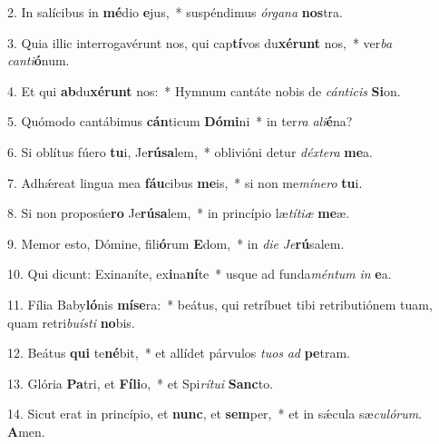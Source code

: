 2. In salícibus in \textbf{mé}dio \textbf{e}jus,~*  suspéndimus \textit{ór}\textit{ga}\textit{na} \textbf{nos}tra.\

3. Quia illic interrogavérunt nos, qui cap\textbf{tí}vos du\textbf{xé}\textbf{runt} nos,~*  ver\textit{ba} \textit{can}\textit{ti}\textbf{ó}num.\

4. Et qui \textbf{ab}du\textbf{xé}\textbf{runt} nos:~*  Hymnum cantáte nobis de \textit{cán}\textit{ti}\textit{cis} \textbf{Si}on.\

5. Quómodo cantábimus \textbf{cán}ticum \textbf{Dó}\textbf{mi}ni~*  in ter\textit{ra} \textit{a}\textit{li}\textbf{é}na?\

6. Si oblítus fúero \textbf{tu}i, Je\textbf{rú}\textbf{sa}lem,~*  oblivióni detur \textit{déx}\textit{te}\textit{ra} \textbf{me}a.\

7. Adhǽreat lingua mea \textbf{fáu}cibus \textbf{me}is,~*  si non me\textit{mí}\textit{ne}\textit{ro} \textbf{tu}i.\

8. Si non proposúe\textbf{ro} Je\textbf{rú}\textbf{sa}lem,~*  in princípio læ\textit{tí}\textit{ti}\textit{æ} \textbf{me}æ.\

9. Memor esto, Dómine, fili\textbf{ó}rum \textbf{E}dom,~*  in \textit{di}\textit{e} \textit{Je}\textbf{rú}salem.\

10. Qui dicunt: Exinaníte, ex\textbf{i}na\textbf{ní}te~*  usque ad funda\textit{mén}\textit{tum} \textit{in} \textbf{e}a.\

11. Fília Baby\textbf{ló}nis \textbf{mí}\textbf{se}ra:~*  beátus, qui retríbuet tibi retributiónem tuam, quam retri\textit{bu}\textit{ís}\textit{ti} \textbf{no}bis.\

12. Beátus \textbf{qui} te\textbf{né}bit,~*  et allídet párvulos \textit{tu}\textit{os} \textit{ad} \textbf{pe}tram.\

13. Glória \textbf{Pa}tri, et \textbf{Fí}\textbf{li}o,~*  et Spi\textit{rí}\textit{tu}\textit{i} \textbf{Sanc}to.\

14. Sicut erat in princípio, et \textbf{nunc}, et \textbf{sem}per,~*  et in sǽcula sæ\textit{cu}\textit{ló}\textit{rum}. \textbf{A}men.\


